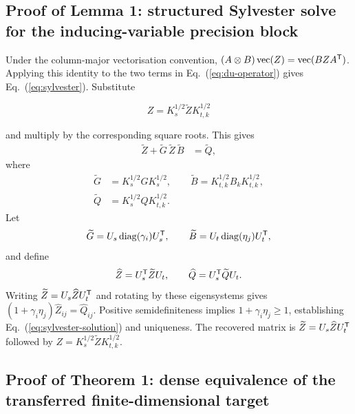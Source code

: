 \subsection{Proof of Lemma 1: structured Sylvester solve for the inducing-variable precision block}
\label{app:sylvester-proof}

Under the column-major vectorisation convention,
$(A\otimes B)\operatorname{vec}(Z)=\operatorname{vec}(BZA^{\mathsf T})$.
Applying this identity to the two terms in Eq.~(\ref{eq:du-operator}) gives
Eq.~(\ref{eq:sylvester}). Substitute

\begin{equation*}
 Z=K_s^{1/2}\widetilde ZK_{t,k}^{1/2}
\end{equation*}

and multiply by the corresponding square roots. This gives
\begin{align*}
\widetilde Z+\widetilde G\,\widetilde Z\,\widetilde B&=\widetilde Q,
\end{align*}
where
\begin{equation*}
\begin{aligned}
\widetilde G&=K_s^{1/2}GK_s^{1/2},\qquad
\widetilde B=K_{t,k}^{1/2}B_kK_{t,k}^{1/2},\\
\widetilde Q&=K_s^{1/2}QK_{t,k}^{1/2}.
\end{aligned}
\end{equation*}
Let
\[
\widetilde G=U_s\operatorname{diag}(\gamma_i)U_s^{\mathsf T},\qquad
\widetilde B=U_t\operatorname{diag}(\eta_j)U_t^{\mathsf T},
\]
and define
\[
\widehat Z=U_s^{\mathsf T}\widetilde ZU_t,\qquad
\widehat Q=U_s^{\mathsf T}\widetilde Q U_t.
\]
Writing $\widetilde Z=U_s\widehat ZU_t^{\mathsf T}$ and rotating by these
eigensystems gives
$(1+\gamma_i\eta_j)\widehat Z_{ij}=\widehat Q_{ij}$.
Positive semidefiniteness implies $1+\gamma_i\eta_j\geq1$, establishing
Eq.~(\ref{eq:sylvester-solution}) and uniqueness. The recovered matrix is
$\widetilde Z=U_s\widehat ZU_t^{\mathsf T}$ followed by
$Z=K_s^{1/2}\widetilde ZK_{t,k}^{1/2}$.

\subsection{Proof of Theorem 1: dense equivalence of the transferred finite-dimensional target}
\label{app:dense-equivalence}

